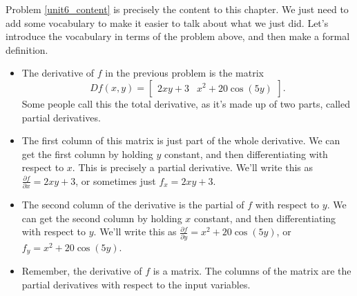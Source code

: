 Problem \ref{unit6_content} is precisely the content to this chapter.  We just need to add some vocabulary to make it easier to talk about what we just did. Let's introduce the vocabulary in terms of the problem above, and then make a formal definition.
\begin{itemize}
 \item The derivative of $f$ in the previous problem is the matrix 
 $$Df(x,y) = \begin{bmatrix}
  2xy+3& 
  x^2+20\cos(5y)
 \end{bmatrix}.$$ 
 Some people call this the total derivative, as it's made up of two parts, called partial derivatives. 
 \item The first column of this matrix is just part of the whole derivative. We can get the first column by holding $y$ constant, and then differentiating with respect to $x$. This is precisely a partial derivative.  We'll write this as $\frac{\partial f}{\partial x} = 2xy+3$, or sometimes just $f_x = 2xy+3$.
 \item The second column of the derivative is the partial of $f$ with respect to $y$. We can get the second column by holding $x$ constant, and then differentiating with respect to $y$. We'll write this as $\frac{\partial f}{\partial y} = x^2+20\cos(5y)$, or $f_y = x^2+20\cos(5y)$.
 \item Remember, the derivative of $f$ is a matrix. The columns of the matrix are the partial derivatives with respect to the input variables. 
\end{itemize}

